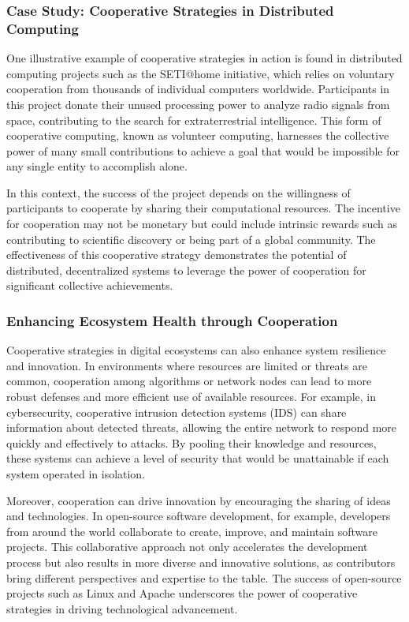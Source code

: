 \documentclass[12pt,twoside]{article}
\begin{document}
\subsubsection{Case Study: Cooperative Strategies in Distributed Computing}

One illustrative example of cooperative strategies in action is found in distributed computing projects such as the SETI@home initiative, which relies on voluntary cooperation from thousands of individual computers worldwide. Participants in this project donate their unused processing power to analyze radio signals from space, contributing to the search for extraterrestrial intelligence. This form of cooperative computing, known as volunteer computing, harnesses the collective power of many small contributions to achieve a goal that would be impossible for any single entity to accomplish alone.

In this context, the success of the project depends on the willingness of participants to cooperate by sharing their computational resources. The incentive for cooperation may not be monetary but could include intrinsic rewards such as contributing to scientific discovery or being part of a global community. The effectiveness of this cooperative strategy demonstrates the potential of distributed, decentralized systems to leverage the power of cooperation for significant collective achievements.

\subsubsection{Enhancing Ecosystem Health through Cooperation}

Cooperative strategies in digital ecosystems can also enhance system resilience and innovation. In environments where resources are limited or threats are common, cooperation among algorithms or network nodes can lead to more robust defenses and more efficient use of available resources. For example, in cybersecurity, cooperative intrusion detection systems (IDS) can share information about detected threats, allowing the entire network to respond more quickly and effectively to attacks. By pooling their knowledge and resources, these systems can achieve a level of security that would be unattainable if each system operated in isolation.

Moreover, cooperation can drive innovation by encouraging the sharing of ideas and technologies. In open-source software development, for example, developers from around the world collaborate to create, improve, and maintain software projects. This collaborative approach not only accelerates the development process but also results in more diverse and innovative solutions, as contributors bring different perspectives and expertise to the table. The success of open-source projects such as Linux and Apache underscores the power of cooperative strategies in driving technological advancement.
\end{document}
